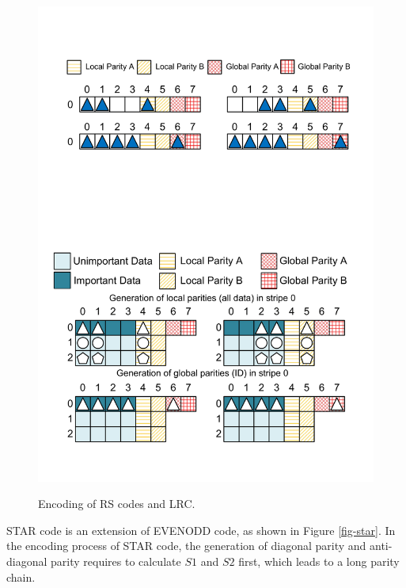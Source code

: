 \documentclass[sigconf]{acmart}
\begin{document}
\begin{figure}
{    \includegraphics[width=0.8\linewidth]{photo/LRC-1.pdf}\label{fig-LRC-1}
}
\caption{Encoding of RS codes and LRC.}
\end{figure}

STAR code \cite{STAR} is an extension of EVENODD \cite{EVENODD} code, as shown in Figure \ref{fig-star}.
In the encoding process of STAR code, the generation of diagonal parity and anti-diagonal parity requires to calculate $S1$ and $S2$ first, which leads to a long parity chain.
\end{document}
